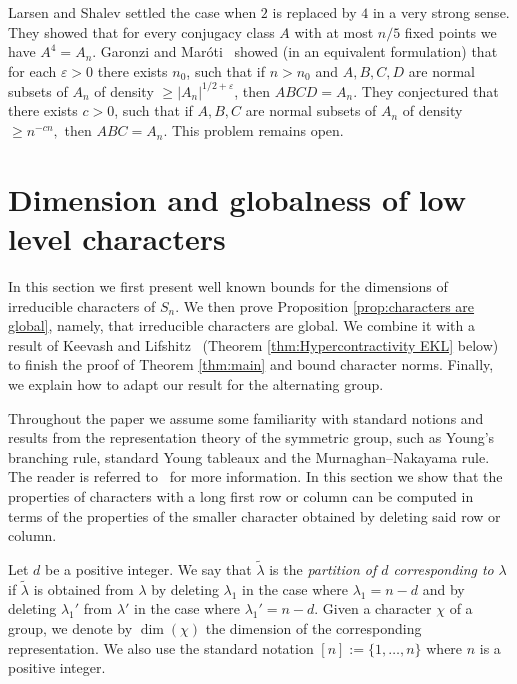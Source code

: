 \documentclass[11pt, letterpaper]{amsart}
\newcommand\eps{\varepsilon}
\renewcommand\ge{\geqslant}
\renewcommand{\epsilon}{\eps}
\begin{document}
Larsen and Shalev\cite{larsen2008characters} settled the case when $2$ is replaced by $4$ in a very strong sense. They showed that for every conjugacy class $A$ with at most $n/5$ fixed points we have $A^4=A_n$. Garonzi and Mar\'{o}ti~\cite{garonzi2021alternating} showed (in an equivalent formulation) that for each $\epsilon>0$ there exists $n_0$, such that if $n>n_0$ and $A,B,C,D$ are normal subsets of $A_n$ of density $\ge |A_n|^{1/2+\epsilon}$, then $ABCD = A_n$. They conjectured that there exists $c>0$, such that if $A,B,C$ are normal subsets of $A_n$ of density $\ge n^{-cn},$ then $ABC = A_n.$ This problem remains open. 

\section{Dimension and globalness of low level characters}\label{sec:proof of main theorem}

In this section we first present well known bounds for the dimensions of irreducible characters of $S_n$. We then prove Proposition \ref{prop:characters are global}, namely, that irreducible characters are global. We combine it with a result of Keevash and Lifshitz~\cite{keevash2023sharp} (Theorem \ref{thm:Hypercontractivity EKL} below) to finish the proof of Theorem \ref{thm:main} and bound character norms. Finally, we explain how to adapt our result for the alternating group.

Throughout the paper we assume some familiarity with standard notions and results from the representation theory of the symmetric group, such as Young's branching rule, standard Young tableaux and the Murnaghan--Nakayama rule. The reader is referred to~\cite{sagan2013symmetric} for more information.
In this section we show that the properties of characters with a long first row or column can be computed in terms of the properties of the smaller character obtained by deleting said row or column. 

Let $d$ be a positive integer.
We say that $\tilde{\lambda}$ is the \emph{partition of $d$ corresponding to} $\lambda$ if $\tilde{\lambda}$ is obtained from $\lambda$ by deleting $\lambda_1$ in the case where $\lambda_1 = n-d$ and by deleting $\lambda_1'$ from $\lambda'$ in the case where $\lambda_1'=n-d$. Given a character $\chi$ of a group, we denote by $\dim(\chi)$ the dimension of the corresponding representation. We also use the standard notation $[n] := \{1,\dots,n\}$ where $n$ is a positive integer.
\end{document}
